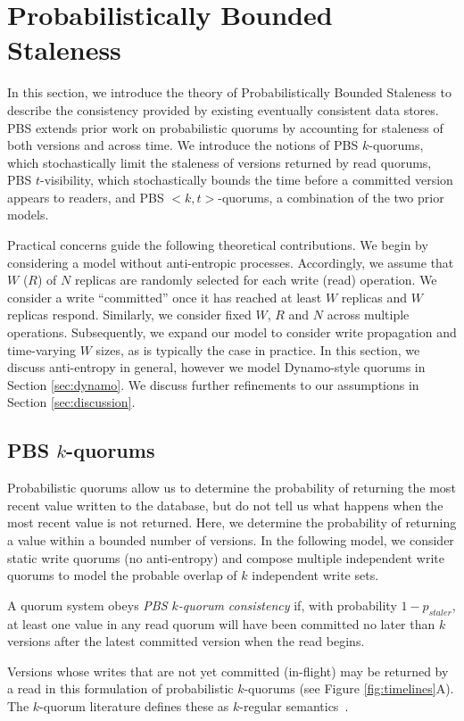 \documentclass{vldb}
\begin{document}
\section{Probabilistically Bounded\\Staleness}
\label{sec:pbs}

In this section, we introduce the theory of Probabilistically Bounded
Staleness to describe the consistency provided by existing eventually
consistent data stores.  PBS extends prior work on
probabilistic quorums by accounting for staleness of both versions and
across time.  We introduce the notions of PBS $k$-quorums, which
stochastically limit the staleness of versions returned by read
quorums, PBS $t$-visibility, which stochastically bounds the time
before a committed version appears to readers, and PBS $<k,
t>$-quorums, a combination of the two prior models.


Practical concerns guide the following theoretical contributions.  We
begin by considering a model without anti-entropic processes.
Accordingly, we assume that $W$ ($R$) of $N$ replicas are randomly
selected for each write (read) operation.  We consider a write
``committed'' once it has reached at least $W$ replicas and $W$ replicas
respond.  Similarly, we consider fixed $W$, $R$ and $N$ across
multiple operations. Subsequently, we expand our model to consider
write propagation and time-varying $W$ sizes, as is typically the case
in practice.  In this section, we discuss anti-entropy in general,
however we model Dynamo-style quorums in Section
\ref{sec:dynamo}. We discuss further refinements to our
assumptions in Section \ref{sec:discussion}.

\subsection{PBS $k$-quorums}

Probabilistic quorums allow us to determine the probability of
returning the most recent value written to the database, but do not
tell us what happens when the most recent value is not returned.
Here, we determine the probability of returning a value within a
bounded number of versions.  In the following model, we consider static
write quorums (no anti-entropy) and compose multiple independent write
quorums to model the probable overlap of $k$ independent write sets.
\begin{definition}
A quorum system obeys \textit{PBS $k$-quorum consistency} if, with
probability $1-p_{staler}$, at least one value in any read quorum will
have been committed no later than $k$ versions after the latest committed
version when the read begins.
\end{definition}
Versions whose writes that are not yet committed (in-flight) may be
returned by a read in this formulation of probabilistic $k$-quorums
(see Figure \ref{fig:timelines}A).  The $k$-quorum literature defines
these as $k$-regular semantics~\cite{non-strict}.
\end{document}
